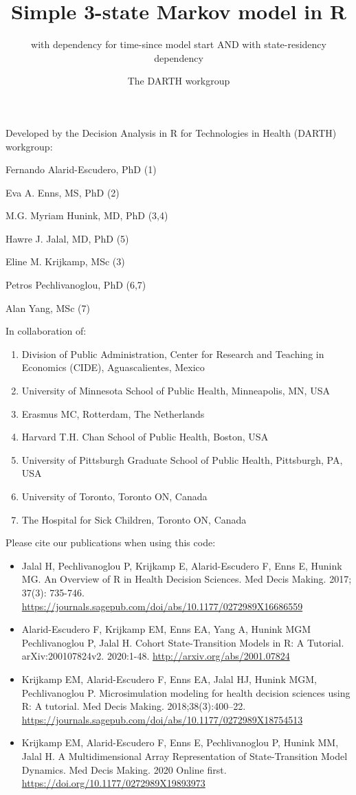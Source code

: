 \documentclass[
]{article}
\title{Simple 3-state Markov model in R}
\subtitle{with dependency for time-since model start AND with state-residency
dependency}
\author{The DARTH workgroup}
\date{}
\providecommand{\tightlist}{%
  \setlength{\itemsep}{0pt}\setlength{\parskip}{0pt}}
\begin{document}
\maketitle

Developed by the Decision Analysis in R for Technologies in Health
(DARTH) workgroup:

Fernando Alarid-Escudero, PhD (1)

Eva A. Enns, MS, PhD (2)

M.G. Myriam Hunink, MD, PhD (3,4)

Hawre J. Jalal, MD, PhD (5)

Eline M. Krijkamp, MSc (3)

Petros Pechlivanoglou, PhD (6,7)

Alan Yang, MSc (7)

In collaboration of:

\begin{enumerate}
\def\labelenumi{\arabic{enumi}.}
\tightlist
\item
  Division of Public Administration, Center for Research and Teaching in
  Economics (CIDE), Aguascalientes, Mexico
\item
  University of Minnesota School of Public Health, Minneapolis, MN, USA
\item
  Erasmus MC, Rotterdam, The Netherlands
\item
  Harvard T.H. Chan School of Public Health, Boston, USA
\item
  University of Pittsburgh Graduate School of Public Health, Pittsburgh,
  PA, USA
\item
  University of Toronto, Toronto ON, Canada
\item
  The Hospital for Sick Children, Toronto ON, Canada
\end{enumerate}

Please cite our publications when using this code:

\begin{itemize}
\item
  Jalal H, Pechlivanoglou P, Krijkamp E, Alarid-Escudero F, Enns E,
  Hunink MG. An Overview of R in Health Decision Sciences. Med Decis
  Making. 2017; 37(3): 735-746.
  \url{https://journals.sagepub.com/doi/abs/10.1177/0272989X16686559}
\item
  Alarid-Escudero F, Krijkamp EM, Enns EA, Yang A, Hunink MGM
  Pechlivanoglou P, Jalal H. Cohort State-Transition Models in R: A
  Tutorial. arXiv:200107824v2. 2020:1-48.
  \url{http://arxiv.org/abs/2001.07824}
\item
  Krijkamp EM, Alarid-Escudero F, Enns EA, Jalal HJ, Hunink MGM,
  Pechlivanoglou P. Microsimulation modeling for health decision
  sciences using R: A tutorial. Med Decis Making. 2018;38(3):400--22.
  \url{https://journals.sagepub.com/doi/abs/10.1177/0272989X18754513}
\item
  Krijkamp EM, Alarid-Escudero F, Enns E, Pechlivanoglou P, Hunink MM,
  Jalal H. A Multidimensional Array Representation of State-Transition
  Model Dynamics. Med Decis Making. 2020 Online first.
  \url{https://doi.org/10.1177/0272989X19893973}
\end{itemize}
\end{document}
